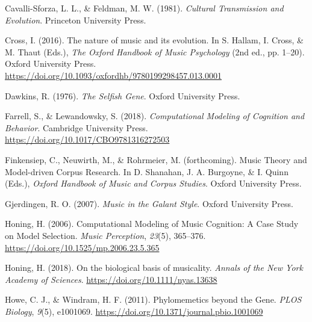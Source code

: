 \documentclass[
  a4paperpaper,
  ,captions=tableheading
]{scrbook}
\newlength{\cslhangindent}
\newlength{\cslentryspacingunit} %
\newenvironment{CSLReferences}[2] %
 {%
  \setlength{\parindent}{0pt}
  \ifodd #1
  \let\oldpar\par
  \def\par{\hangindent=\cslhangindent\oldpar}
  \fi
  \setlength{\parskip}{#2\cslentryspacingunit}
 }%
 {}
\begin{document}
\begin{CSLReferences}{1}{0}
\leavevmode{}%
Cavalli-Sforza, L. L., \& Feldman, M. W. (1981). \emph{Cultural
{Transmission} and {Evolution}}. {Princeton University Press}.

\leavevmode{}%
Cross, I. (2016). The nature of music and its evolution. In S. Hallam,
I. Cross, \& M. Thaut (Eds.), \emph{The {Oxford Handbook} of {Music
Psychology}} (2nd ed., pp. 1--20). {Oxford University Press}.
\url{https://doi.org/10.1093/oxfordhb/9780199298457.013.0001}

\leavevmode{}%
Dawkins, R. (1976). \emph{The {Selfish Gene}}. {Oxford University
Press}.

\leavevmode{}%
Farrell, S., \& Lewandowsky, S. (2018). \emph{Computational {Modeling}
of {Cognition} and {Behavior}}. {Cambridge University Press}.
\url{https://doi.org/10.1017/CBO9781316272503}

\leavevmode{}%
Finkensiep, C., Neuwirth, M., \& Rohrmeier, M. (forthcoming). Music
{Theory} and {Model-driven Corpus Research}. In D. Shanahan, J. A.
Burgoyne, \& I. Quinn (Eds.), \emph{Oxford {Handbook} of {Music} and
{Corpus Studies}}. {Oxford University Press}.

\leavevmode{}%
Gjerdingen, R. O. (2007). \emph{Music in the {Galant Style}}. {Oxford
University Press}.

\leavevmode{}%
Honing, H. (2006). Computational {Modeling} of {Music Cognition}: {A
Case Study} on {Model Selection}. \emph{Music Perception}, \emph{23}(5),
365--376. \url{https://doi.org/10.1525/mp.2006.23.5.365}

\leavevmode{}%
Honing, H. (2018). On the biological basis of musicality. \emph{Annals
of the New York Academy of Sciences}.
\url{https://doi.org/10.1111/nyas.13638}

\leavevmode{}%
Howe, C. J., \& Windram, H. F. (2011).
Phylomemetics beyond the {Gene}.
\emph{PLOS Biology}, \emph{9}(5), e1001069.
\url{https://doi.org/10.1371/journal.pbio.1001069}


\end{CSLReferences}
\end{document}
